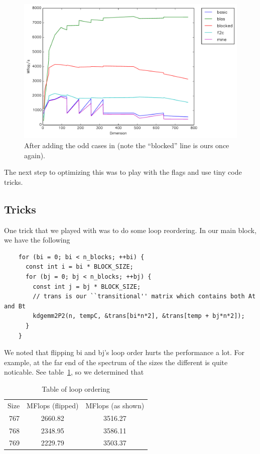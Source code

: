 \documentclass{article}
\begin{document}
  \begin{figure}[h]
    \centering
    \includegraphics[width=.7\textwidth]{odd.pdf}
    \caption{After adding the odd cases in (note the ``blocked'' line is ours once again).}
    \label{fig:odd}
  \end{figure}

  The next step to optimizing this was to play with the flags and use tiny code tricks.

  \subsection{Tricks}
    One trick that we played with was to do some loop reordering. In our main block, we have the following

    \begin{lstlisting}
    for (bi = 0; bi < n_blocks; ++bi) {
      const int i = bi * BLOCK_SIZE;
      for (bj = 0; bj < n_blocks; ++bj) {
        const int j = bj * BLOCK_SIZE;
        // trans is our ``transitional'' matrix which contains both At and Bt
        kdgemm2P2(n, tempC, &trans[bi*n*2], &trans[temp + bj*n*2]);
      }
    }
    \end{lstlisting}

    We noted that flipping bi and bj's loop order hurts the performance a lot. For example, at the far end of the spectrum of the sizes
    the different is quite noticable. See table~\ref{tab:looporder}, so we determined that 

    \begin{table}
      \centering
      \begin{tabular}{r c c}
        Size & MFlops (flipped) & MFlops (as shown) \\
        767  & 2660.82 & 3516.27\\
        768  & 2348.95 & 3586.11\\
        769  & 2229.79 & 3503.37
      \end{tabular}
      \caption{Table of loop ordering}
      \label{tab:looporder}
    \end{table}
\end{document}
